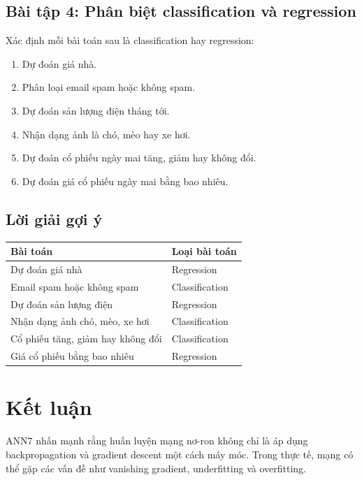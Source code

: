 \subsection*{Bài tập 4: Phân biệt classification và regression}

Xác định mỗi bài toán sau là classification hay regression:

\begin{enumerate}
    \item Dự đoán giá nhà.
    \item Phân loại email spam hoặc không spam.
    \item Dự đoán sản lượng điện tháng tới.
    \item Nhận dạng ảnh là chó, mèo hay xe hơi.
    \item Dự đoán cổ phiếu ngày mai tăng, giảm hay không đổi.
    \item Dự đoán giá cổ phiếu ngày mai bằng bao nhiêu.
\end{enumerate}

\subsection*{Lời giải gợi ý}

\begin{center}
\begin{tabular}{ll}
\toprule
Bài toán & Loại bài toán \\
\midrule
Dự đoán giá nhà & Regression \\
Email spam hoặc không spam & Classification \\
Dự đoán sản lượng điện & Regression \\
Nhận dạng ảnh chó, mèo, xe hơi & Classification \\
Cổ phiếu tăng, giảm hay không đổi & Classification \\
Giá cổ phiếu bằng bao nhiêu & Regression \\
\bottomrule
\end{tabular}
\end{center}

\section*{Kết luận}

ANN7 nhấn mạnh rằng huấn luyện mạng nơ-ron không chỉ là áp dụng backpropagation và gradient descent một cách máy móc. Trong thực tế, mạng có thể gặp các vấn đề như vanishing gradient, underfitting và overfitting.

